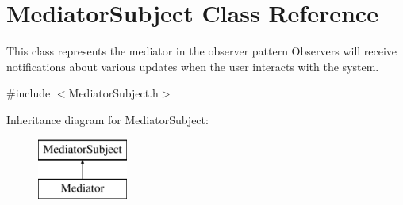 \hypertarget{classMediatorSubject}{
\section{MediatorSubject Class Reference}
\label{classMediatorSubject}
}


This class represents the mediator in the observer pattern Observers will receive notifications about various updates when the user interacts with the system.  




{\ttfamily \#include $<$MediatorSubject.h$>$}

Inheritance diagram for MediatorSubject:\begin{figure}[H]
\begin{center}
\leavevmode
\includegraphics[height=2.000000cm]{classMediatorSubject}
\end{center}
\end{figure}
